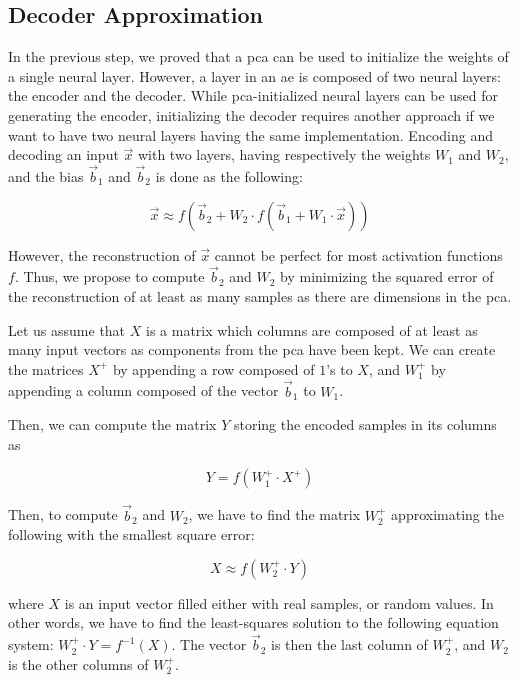 \documentclass[conference]{IEEEtran}
\begin{document}
\subsection{Decoder Approximation}
In the previous step, we proved that a \ac{pca} can be used to initialize the weights of a single neural layer.
However, a layer in an \ac{ae} is composed of two neural layers: the encoder and the decoder.
While \ac{pca}-initialized neural layers can be used for generating the encoder, initializing the decoder requires another approach if we want to have two neural layers having the same implementation.
Encoding and decoding an input $\vec{x}$ with two layers, having respectively the weights $W_1$ and $W_2$, and the bias $\vec{b}_1$ and $\vec{b}_2$ is done as the following:

\begin{equation}
  \vec{x} \approx f\left(\vec{b}_2 + W_2 \cdot f\left(\vec{b}_1 + W_1 \cdot \vec{x}\right)\right)
\end{equation}

However, the reconstruction of $\vec{x}$ cannot be perfect for most activation functions $f$.
Thus, we propose to compute $\vec{b}_2$ and $W_2$ by minimizing the squared error of the reconstruction of at least as many samples as there are dimensions in the \ac{pca}.

Let us assume that $X$ is a matrix which columns are composed of at least as many input vectors as components from the \ac{pca} have been kept.
We can create the matrices $X^+$ by appending a row composed of $1$'s to $X$, and $W_1^+$ by appending a column composed of the vector $\vec{b}_1$ to $W_1$.

Then, we can compute the matrix $Y$ storing the encoded samples in its columns as

\begin{equation}
  Y = f\left(W_1^+ \cdot X^+\right)
\end{equation}

Then, to compute $\vec{b}_2$ and $W_2$, we have to find the matrix $W_2^+$ approximating the following with the smallest square error:

\begin{equation}
  X \approx f\left(W_2^+ \cdot Y\right)
\end{equation}

\noindent where $X$ is an input vector filled either with real samples, or random values.
In other words, we have to find the least-squares solution to the following equation system: $W_2^+\cdot Y = f^{-1}\left(X\right)$.
The vector $\vec{b}_2$ is then the last column of $W_2^+$, and $W_2$ is the other columns of $W_2^+$.
\end{document}
